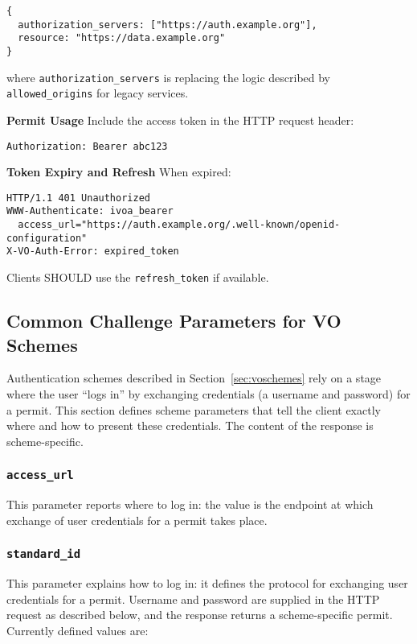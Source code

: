 \documentclass[11pt,a4paper]{ivoa}
\begin{document}
\begin{verbatim}
{
  authorization_servers: ["https://auth.example.org"],
  resource: "https://data.example.org"
}
\end{verbatim}

where \texttt{authorization\_servers} is replacing the logic described by \texttt{allowed\_origins} for legacy services.


\textbf{Permit Usage}
Include the access token in the HTTP request header:
\begin{verbatim}
Authorization: Bearer abc123
\end{verbatim}

\textbf{Token Expiry and Refresh}
When expired:
\begin{verbatim}
HTTP/1.1 401 Unauthorized
WWW-Authenticate: ivoa_bearer
  access_url="https://auth.example.org/.well-known/openid-configuration"
X-VO-Auth-Error: expired_token
\end{verbatim}

Clients SHOULD use the \texttt{refresh\_token} if available.


\subsection{Common Challenge Parameters for VO Schemes}
\label{sec:common-params}

Authentication schemes described in Section~\ref{sec:voschemes}
rely on a stage where the user ``logs in'' by exchanging
credentials (a username and password) for a permit.
This section defines scheme parameters that
tell the client exactly where and how to present these credentials.
The content of the response is scheme-specific.

\subsubsection{\mbox{\tt access\_url}}
\label{sec:access-url}

This parameter reports where to log in:
the value is the endpoint at which
exchange of user credentials for a permit
takes place.

\subsubsection{\mbox{\tt standard\_id}}
\label{sec:standard-id}

This parameter explains how to log in:
it defines the protocol for exchanging user credentials
for a permit.
Username and password are supplied in the HTTP request as described below,
and the response returns a scheme-specific permit.
Currently defined values are:
\end{document}
